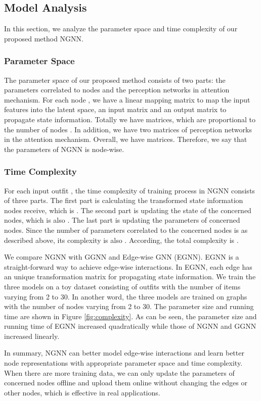 \documentclass[sigconf]{acmart}
\begin{document}
\subsection{Model Analysis}

In this section, we analyze the parameter space and time complexity of our proposed method NGNN.

\subsubsection{Parameter Space}\label{sect:parameter}
The parameter space of our proposed method consists of two parts: the parameters correlated to nodes and the perception networks in attention mechanism.
For each node , we have a linear mapping matrix  to map the input features into the latent space, an input matrix  and an output matrix  to propagate state information. Totally we have  matrices, which are proportional to the number of nodes . In addition, we have two matrices of perception networks in the attention mechanism. Overall, we have  matrices. Therefore, we say that the parameters of NGNN is node-wise. 

\subsubsection{Time Complexity}
For each input outfit , the time complexity of training process in NGNN consists of three parts. The first part is calculating the transformed state information nodes receive, which is . The second part is updating the state of the concerned nodes, which is also .
The last part is updating the parameters of concerned nodes. Since the number of parameters correlated to the concerned nodes is  as described above, its complexity is also . According, the total complexity is .

We compare NGNN with GGNN \cite{li2015gated} and Edge-wise GNN (EGNN). EGNN is a straight-forward way to achieve edge-wise interactions. In EGNN, each edge has an unique transformation matrix for propagating state information. We train the three models on a toy dataset consisting of outfits with the number of items varying from 2 to 30. In another word, the three models are trained on graphs with the number of nodes varying from 2 to 30.
The parameter size and running time are shown in Figure \ref{fig:complexity}.
As can be seen, the parameter size and running time of EGNN increased quadratically while those of NGNN and GGNN increased linearly.


In summary, NGNN can better model edge-wise interactions and learn better node representations with appropriate parameter space and time complexity. When there are more training data, we can only update the parameters of concerned nodes offline and upload them online without changing the edges or other nodes, which is effective in real applications.
\end{document}
